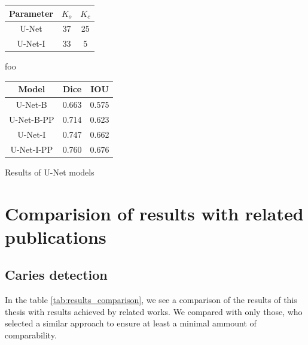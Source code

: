 \begin{minipage}{\textwidth}

    \begin{minipage}[t]{0.48\textwidth}
        \centering
        \makeatletter{}
        \begin{tabular}{|c|c|c|}
            \hline
            Parameter & $K_o$ & $K_c$ \\ \hline
            U-Net     & 37    & 25    \\ \hline
            U-Net-I   & 33    & 5     \\ \hline
        \end{tabular}
        \caption{foo}
        \label{tab:unet_seg_hyperparams}
    \end{minipage}
    \begin{minipage}[t]{0.48\textwidth}
        \centering
        \makeatletter{}
        \begin{tabular}{|c|c|c|}
            \hline
            Model      & Dice  & IOU   \\ \hline
            U-Net-B    & 0.663 & 0.575 \\ \hline
            U-Net-B-PP & 0.714 & 0.623 \\ \hline
            U-Net-I    & 0.747 & 0.662 \\ \hline
            U-Net-I-PP & 0.760 & 0.676 \\ \hline
        \end{tabular}
        \caption{Results of U-Net models}
        \label{tab:unet_seg_results}
    \end{minipage}
\end{minipage}


\section{Comparision of results with related publications}
\label{sec:result_comparision_with_lit}
\subsection{Caries detection}
In the table \ref{tab:results_comparison}, we see a comparison of the results of this thesis with results achieved by related works. We compared with only those, who selected a similar approach to ensure at least a minimal ammount of comparability.

